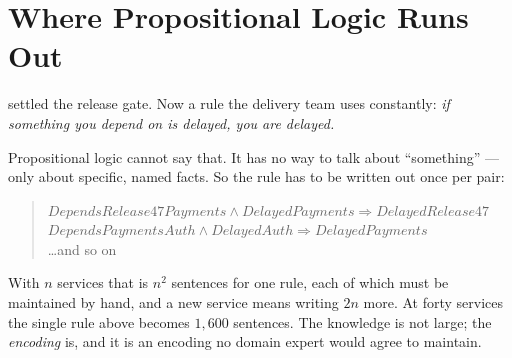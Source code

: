 \section{Where Propositional Logic Runs Out}

 settled the release gate. Now a rule the delivery team uses
constantly: \emph{if something you depend on is delayed, you are delayed.}

Propositional logic cannot say that. It has no way to talk about ``something'' ---
only about specific, named facts. So the rule has to be written out once per pair:

\begin{quote}
$\mathit{DependsRelease47Payments} \wedge \mathit{DelayedPayments} \Rightarrow
\mathit{DelayedRelease47}$\\
$\mathit{DependsPaymentsAuth} \wedge \mathit{DelayedAuth} \Rightarrow
\mathit{DelayedPayments}$\\
\ldots and so on
\end{quote}

With $n$ services that is $n^{2}$ sentences for one rule, each of which must be
maintained by hand, and a new service means writing $2n$ more. At forty services the
single rule above becomes $1{,}600$ sentences. The knowledge is not large; the
\emph{encoding} is, and it is an encoding no domain expert would agree to maintain.

